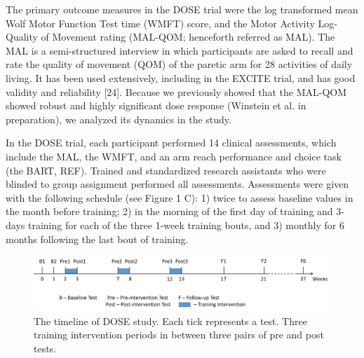 The primary outcome measures in the DOSE trial were the log transformed mean Wolf Motor Function Test time (WMFT) score, and the Motor Activity Log-Quality of Movement rating (MAL-QOM; henceforth referred as MAL). 
The MAL is a semi-structured interview in which participants are asked to recall and rate the quality of movement (QOM) of the paretic arm for 28 activities of daily living. 
It has been used extensively, including in the EXCITE trial, and has good validity and reliability [24]. 
Because we previously showed that the MAL-QOM showed robust and highly significant dose response (Winstein et al. in preparation), we analyzed its dynamics in the study.

In the DOSE trial, each participant performed 14 clinical assessments, which include the MAL, the WMFT, and an arm reach performance and choice task (the BART, REF). 
Trained and standardized research assistants who were blinded to group assignment performed all assessments. 
Assessments were given with the following schedule (see Figure 1 C): 1) twice to assess baseline values in the month before training; 2) in the morning of the first day of training and 3-days training for each of the three 1-week training bouts, and 3) monthly for 6 months following the last bout of training.  

\begin{figure}
	\centering
	\includegraphics[width=1\linewidth]{figures/dosetimeline}
	\caption[DOSE Study Timeline]{The timeline of DOSE study. Each tick represents a test. Three training intervention periods in between three pairs of pre and post tests.}
	\label{fig:dosetimeline}
\end{figure}

